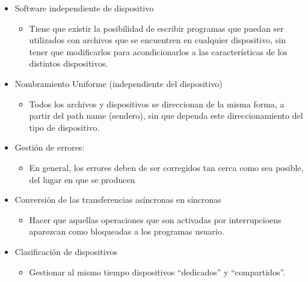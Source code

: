 \documentclass[10pt,portrait, twocolumn]{article}
\begin{document}
\begin{itemize}
\item Software independiente de dispositivo
	\begin{itemize}
	\item Tiene que existir la posibilidad de escribir programas que puedan ser utilizados con archivos que se encuentren en cualquier dispositivo, sin tener que modificarlos para acondicionarlos a las características de los distintos dispositivos.
	\end{itemize}
\item Nombramiento Uniforme (independiente del dispositivo)
	\begin{itemize}
	\item Todos los archivos y dispositivos se direccionan de la misma forma, a partir del path name (sendero), sin que dependa este direccionamiento del tipo de dispositivo.
	\end{itemize}
\item Gestión de errores:
	\begin{itemize}
	\item En general, los errores deben de ser corregidos tan cerca como sea posible, del lugar en que se producen
	\end{itemize}
\item Conversión de las transferencias asíncronas en síncronas
	\begin{itemize}
	\item Hacer que aquellas operaciones que son activadas por interrupcioens aparezcan como bloqueadas a los programas usuario.
	\end{itemize}
\item Clasificación de dispositivos
	\begin{itemize}
	\item Gestionar al mismo tiempo dispositivos ``dedicados'' y ``compartidos''.
	\end{itemize}
\end{itemize}
\end{document}

